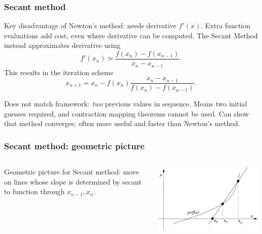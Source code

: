 \documentclass{beamer}
\begin{document}
\begin{frame}
  \frametitle{Secant method}

  Key disadvantage of Newton's method: needs derivative $f'(x)$. Extra function evaluations add cost, even where derivative can be computed. The Secant Method instead approximates derivative using
  \begin{equation*}
    f'(x_n) \simeq \frac{f \left (x_n \right ) - f \left ( x_{n-1}
      \right )}{x_n - x_{n-1}} .
  \end{equation*}
  This results in the iteration scheme
  \begin{equation*}
    x_{n+1} = x_n - f(x_n) \frac{x_n - x_{n-1}}{f(x_n) - f(x_{n-1})}.
  \end{equation*} \pause

  Does not match framework: \emph{two} previous values in sequence. Means two initial guesses required, and contraction mapping theorems cannot be used.  Can show that method converges; often more useful and faster than Newton's method.

\end{frame}


\begin{frame}
  \frametitle{Secant method: geometric picture}

  \begin{columns}
    \begin{column}{0.5\textwidth}
      Geometric picture for Secant method: move on lines whose slope is determined by secant to function through $x_{n-1}, x_n$.
    \end{column}
    \begin{column}{0.5\textwidth}
      \begin{center}
        \includegraphics[width=\textwidth]{figures/secant}
      \end{center}
    \end{column}
  \end{columns}

\end{frame}
\end{document}
